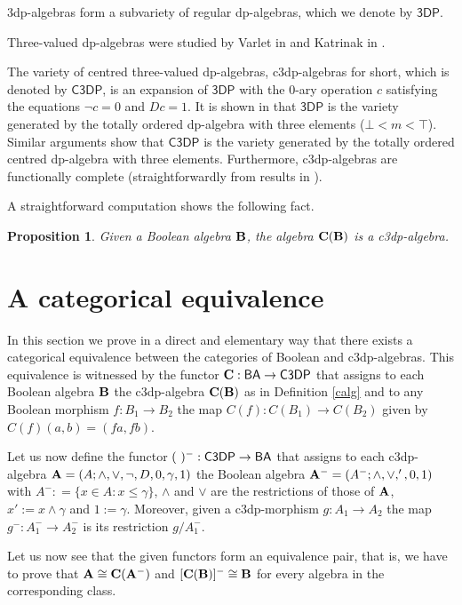\documentclass[a4paper,11pt]{article}
\newtheorem{prop}[theorem]{Proposition}
\theoremstyle{definition}
\newcommand{\hd}{\mathsf{3DP}}
\newcommand{\hdz}{\mathsf{C3DP}}
\newcommand{\bool}{\mathsf{BA}}
\begin{document}
3dp-algebras form a subvariety of regular dp-algebras, which we denote by $\hd$. 

Three-valued dp-algebras were studied by Varlet in \cite{V1972} and Katrinak in \cite{TK}.

The variety of centred three-valued dp-algebras, c3dp-algebras for short, which is denoted by $\hdz$, is an expansion of $\hd$ with the $0$-ary operation $c$ satisfying the equations $\neg c = 0$ and $Dc = 1$. 
It is shown in \cite{CE} that $\hd$ is the variety generated by the totally ordered dp-algebra with three elements ($\bot < m < \top$). 
Similar arguments show that $\hdz$ is the variety generated by the totally ordered centred dp-algebra with three elements. 
Furthermore, c3dp-algebras are functionally complete (straightforwardly from results in \cite{CE}).

A straightforward computation shows the following fact.

\begin{prop}
Given a Boolean algebra ${\bf{B}}$, the algebra ${\bf{C(B)}}$ is a c3dp-algebra.
\end{prop}


\section{A categorical equivalence} \label{OSM-G}

In this section we prove in a direct and elementary way that there exists a categorical equivalence between the categories of Boolean and c3dp-algebras.
This equivalence is witnessed by the functor ${\bf{C}}: {\bf{\bool}} \to {\bf{\hdz}}$ that assigns to each Boolean algebra ${\bf{B}}$  the c3dp-algebra ${\bf{C(B)}}$ as in Definition \ref{calg} and to any Boolean morphism $f:B_1 \to B_2$ the map $C(f): C(B_1) \to C(B_2)$ given by $C(f) (a,b) = (fa,fb)$.

Let us now define the functor ${\bf{(\ )^-}}: {\bf{\hdz}} \to {\bf{\bool}}$ that assigns to each c3dp-algebra ${\bf{A}} = (A; \wedge, \vee, \neg, D, 0, \gamma, 1)$ the Boolean algebra ${\bf{A^-}} = (A^-; \wedge, \vee, ', 0, 1)$ with $A^- : = \{x \in A:  x \leq \gamma \}$, $\wedge$ and $\vee$ are the restrictions of those of ${\bf{A}}$, $x' := x \wedge \gamma$ and $1 := \gamma$. 
Moreover,  given a c3dp-morphism $g: A_1 \to A_2$ the map $g^-: A_1^- \to A_2^-$ is its restriction $g/A_1^-$.

Let us now see that the given functors form an equivalence pair, that is, we have to prove that ${\bf{A}} \cong {\bf{C(A^-)}}$ and ${\bf{[C(B)]^-}} \cong {\bf{B}}$ for every algebra in the corresponding class.
\end{document}
